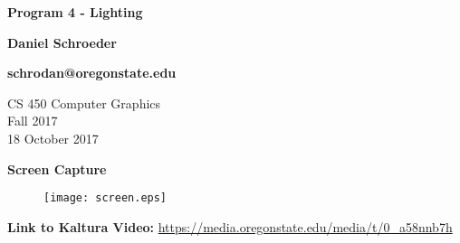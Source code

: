 \documentclass[10pt, draftclsnofoot, onecolumn]{IEEEtran}
\begin{document}
\begin{titlepage}
    \begin{center}
        \vspace*{1.5cm}

        \textbf{Program 4 - Lighting}

        \textbf{Daniel Schroeder}
        
        \textbf{schrodan@oregonstate.edu}

        \vspace{1.5cm}

        CS 450 Computer Graphics\\
        Fall 2017\\
        18 October 2017\\

        \vspace{1.5cm}

        \textbf{Screen Capture}
        \begin{figure}[H]
            \centering 
                \centering
                \texttt{[image: screen.eps]} 
        \end{figure}
        \vspace{1.5cm}

        \textbf{Link to Kaltura Video:} 
        \url{https://media.oregonstate.edu/media/t/0_a58nnb7h}

    \end{center}
\end{titlepage}
\end{document}
